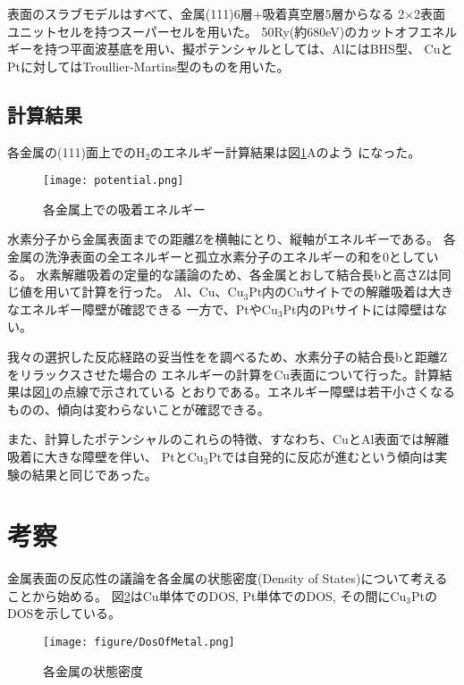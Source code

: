 \documentclass[12pt]{ltjsarticle}
\begin{document}
表面のスラブモデルはすべて、金属(111)6層+吸着真空層5層からなる
2×2表面ユニットセルを持つスーパーセルを用いた。
50Ry(約680eV)のカットオフエネルギーを持つ平面波基底を用い、擬ポテンシャルとしては、AlにはBHS型、
CuとPtに対してはTroullier-Martins型のものを用いた。

\subsection{計算結果}
各金属の(111)面上での$\text{H}_\text{2}$のエネルギー計算結果は図\ref{fig:potential}Aのよう
になった。\\

\begin{figure}[hbtp]
    \begin{center}
     \texttt{[image: potential.png]}
    \end{center}
    \caption{各金属上での吸着エネルギー}
    \label{fig:potential}
\end{figure}

水素分子から金属表面までの距離Zを横軸にとり、縦軸がエネルギーである。
各金属の洗浄表面の全エネルギーと孤立水素分子のエネルギーの和を0としている。
水素解離吸着の定量的な議論のため、各金属とおして結合長bと高さZは同じ値を用いて計算を行った。
Al、Cu、$\text{Cu}_\text{3}$Pt内のCuサイトでの解離吸着は大きなエネルギー障壁が確認できる
一方で、Ptや$\text{Cu}_\text{3}$Pt内のPtサイトには障壁はない。

我々の選択した反応経路の妥当性をを調べるため、水素分子の結合長bと距離Zをリラックスさせた場合の
エネルギーの計算をCu表面について行った。計算結果は図\ref{fig:potential}の点線で示されている
とおりである。エネルギー障壁は若干小さくなるものの、傾向は変わらないことが確認できる。

また、計算したポテンシャルのこれらの特徴、すなわち、CuとAl表面では解離吸着に大きな障壁を伴い、
Ptと$\text{Cu}_\text{3}$Ptでは自発的に反応が進むという傾向は実験の結果と同じであった。

\section{考察}

金属表面の反応性の議論を各金属の状態密度(Density of States)について考えることから始める。
図\ref{fig:dosmetal}はCu単体でのDOS, Pt単体でのDOS, その間に$\text{Cu}_\text{3}$Ptの
DOSを示している。

\begin{figure}[hbtp]
    \begin{center}
     \texttt{[image: figure/DosOfMetal.png]}
    \end{center}
    \caption{各金属の状態密度}
    \label{fig:dosmetal}
\end{figure}
\end{document}
